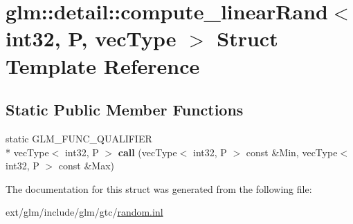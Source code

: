 \hypertarget{structglm_1_1detail_1_1compute__linear_rand_3_01int32_00_01_p_00_01vec_type_01_4}{\section{glm\-:\-:detail\-:\-:compute\-\_\-linear\-Rand$<$ int32, P, vec\-Type $>$ Struct Template Reference}
\label{structglm_1_1detail_1_1compute__linear_rand_3_01int32_00_01_p_00_01vec_type_01_4}
}
\subsection*{Static Public Member Functions}
\begin{DoxyCompactItemize}
\item 
\hypertarget{structglm_1_1detail_1_1compute__linear_rand_3_01int32_00_01_p_00_01vec_type_01_4_ac09eec8e177afcecc1e0d52d6d9951b3}{static G\-L\-M\-\_\-\-F\-U\-N\-C\-\_\-\-Q\-U\-A\-L\-I\-F\-I\-E\-R \\*
vec\-Type$<$ int32, P $>$ {\bfseries call} (vec\-Type$<$ int32, P $>$ const \&Min, vec\-Type$<$ int32, P $>$ const \&Max)}\label{structglm_1_1detail_1_1compute__linear_rand_3_01int32_00_01_p_00_01vec_type_01_4_ac09eec8e177afcecc1e0d52d6d9951b3}

\end{DoxyCompactItemize}


The documentation for this struct was generated from the following file\-:\begin{DoxyCompactItemize}
\item 
ext/glm/include/glm/gtc/\hyperlink{random_8inl}{random.\-inl}\end{DoxyCompactItemize}
